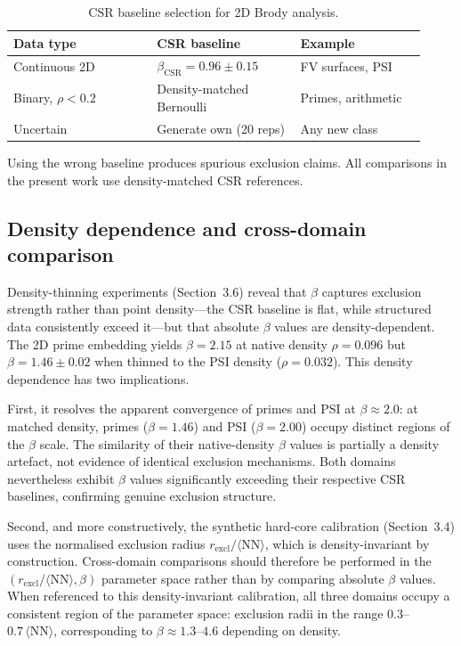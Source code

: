 \documentclass[final,3p,times,twocolumn]{elsarticle}
\theoremstyle{definition}
\begin{document}
\begin{table}[htbp]
  \centering
  \caption{CSR baseline selection for 2D Brody analysis.}
  \label{tab:csr-baseline}
  \small
  \begin{tabular}{@{}p{0.32\linewidth}p{0.32\linewidth}p{0.28\linewidth}@{}}
    \toprule
    Data type & CSR baseline & Example \\
    \midrule
    Continuous 2D & $\beta_{\text{CSR}}=0.96\pm0.15$ & FV surfaces, PSI \\
    Binary, $\rho<0.2$ & Density-matched Bernoulli & Primes, arithmetic \\
    Uncertain & Generate own (20 reps) & Any new class \\
    \bottomrule
  \end{tabular}
\end{table}

Using the wrong baseline produces spurious exclusion claims. All
comparisons in the present work use density-matched CSR references.

\subsection{Density dependence and cross-domain comparison}

Density-thinning experiments (Section~3.6) reveal that $\beta$ captures
exclusion strength rather than point density---the CSR baseline is
flat, while structured data consistently exceed it---but that absolute
$\beta$ values are density-dependent. The 2D prime embedding yields
$\beta = 2.15$ at native density $\rho = 0.096$ but $\beta = 1.46 \pm
0.02$ when thinned to the PSI density ($\rho = 0.032$). This
density dependence has two implications.

First, it resolves the apparent convergence of primes and PSI at
$\beta \approx 2.0$: at matched density, primes ($\beta = 1.46$) and
PSI ($\beta = 2.00$) occupy distinct regions of the $\beta$ scale. The
similarity of their native-density $\beta$ values is partially a density
artefact, not evidence of identical exclusion mechanisms. Both domains
nevertheless exhibit $\beta$ values significantly exceeding their
respective CSR baselines, confirming genuine exclusion structure.

Second, and more constructively, the synthetic hard-core calibration
(Section~3.4) uses the normalised exclusion radius
$r_{\text{excl}}/\langle\text{NN}\rangle$, which is density-invariant
by construction. Cross-domain comparisons should therefore be performed
in the $(r_{\text{excl}}/\langle\text{NN}\rangle, \beta)$ parameter
space rather than by comparing absolute $\beta$ values. When referenced
to this density-invariant calibration, all three domains occupy a
consistent region of the parameter space: exclusion radii in the range
$0.3$--$0.7\,\langle\text{NN}\rangle$, corresponding to $\beta \approx
1.3$--$4.6$ depending on density.
\end{document}
